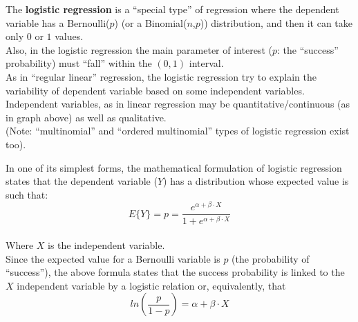 \begin{frame}
 \vspace{.25cm}
  The \textbf{logistic regression} is a ``special type'' of regression where the dependent variable has a Bernoulli($p$) (or a Binomial($n$,$p$)) distribution, and then it can take only $0$ or $1$ values.\\
 \vspace{0.25cm}
  Also, in the logistic regression the main parameter of interest ($p$: the ``success'' probability) must ``fall'' within the $(0,1)$ interval.\\
 \vspace{0.25cm}
  As in ``regular linear'' regression, the logistic regression try to explain the variability of dependent variable based on some independent variables.\\
  \vspace{0.25cm}
  Independent variables, as in linear regression may be quantitative/continuous (as in graph above) as well as qualitative.\\
  \vspace{.25cm}
  (Note: ``multinomial'' and ``ordered multinomial'' types of logistic regression exist too).
\end{frame}

\begin{frame}
 \vspace{.5cm}
  In one of its simplest forms, the mathematical formulation of logistic regression states that the dependent variable ($Y$) has a distribution whose expected value is such that:
 \vspace{0.25cm}
  $$E\{Y\}=p=\dfrac{e^{\alpha+\beta \cdot X}}{1+e^{\alpha+\beta \cdot X}}$$\\
  \vspace{.25cm}
  Where $X$ is the independent variable.\\
  \vspace{.25cm}
  Since the expected value for a Bernoulli variable is $p$ (the probability of ``success''), the above formula states that the success probability is linked to the $X$ independent variable by a logistic relation or, equivalently, that\\
  $$ln\left(\dfrac{p}{1-p}\right)=\alpha+\beta \cdot X$$
\end{frame}


